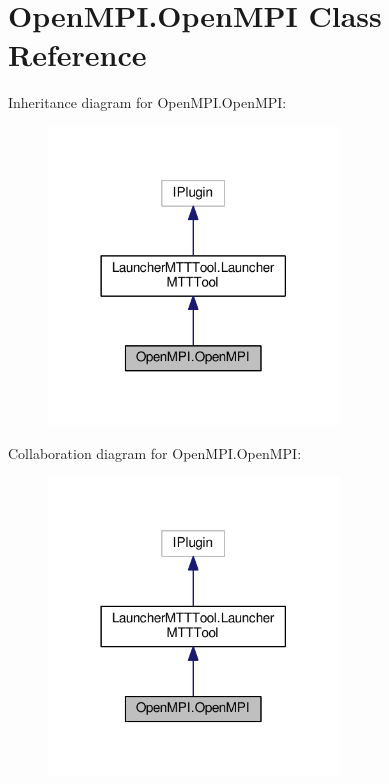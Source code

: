 \hypertarget{class_open_m_p_i_1_1_open_m_p_i}{\section{Open\-M\-P\-I.\-Open\-M\-P\-I Class Reference}
\label{class_open_m_p_i_1_1_open_m_p_i}
}


Inheritance diagram for Open\-M\-P\-I.\-Open\-M\-P\-I\-:
\nopagebreak
\begin{figure}[H]
\begin{center}
\leavevmode
\includegraphics[width=218pt]{class_open_m_p_i_1_1_open_m_p_i__inherit__graph}
\end{center}
\end{figure}


Collaboration diagram for Open\-M\-P\-I.\-Open\-M\-P\-I\-:
\nopagebreak
\begin{figure}[H]
\begin{center}
\leavevmode
\includegraphics[width=218pt]{class_open_m_p_i_1_1_open_m_p_i__coll__graph}
\end{center}
\end{figure}
